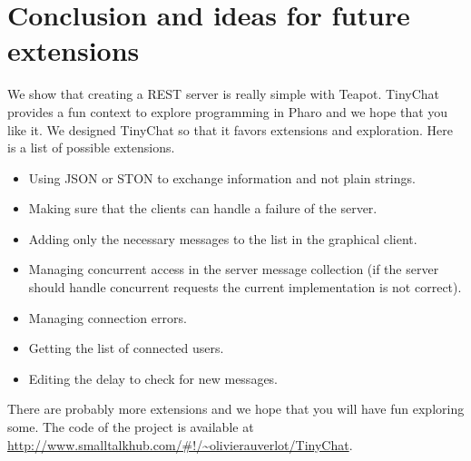 \documentclass[10pt,twoside,english]{_support/latex/sbabook/sbabook}
\begin{document}
\section{Conclusion and ideas for future extensions}
We show that creating a REST server is really simple with Teapot. 
TinyChat provides a fun context to explore programming in Pharo and we hope that you like it. 
We designed TinyChat so that it favors extensions and exploration. Here is a list of possible extensions.

\begin{itemize}
\item Using JSON or STON to exchange information and not plain strings.
\item Making sure that the clients can handle a failure of the server.
\item Adding only the necessary messages to the list in the graphical client. 
\item Managing concurrent access in the server message collection (if the server should handle concurrent requests the current implementation is not correct).
\item Managing connection errors. 
\item Getting the list of connected users. 
\item Editing the delay to check for new messages. 
\end{itemize}

There are probably more extensions and we hope that you will have fun exploring some.  
The code of the project is available at  \url{http://www.smalltalkhub.com/#!/~olivierauverlot/TinyChat}.



\backmatter



\end{document}
